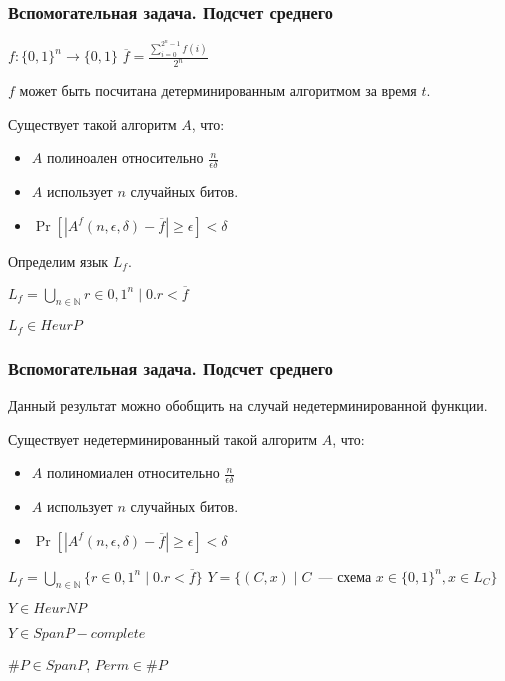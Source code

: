 \begin{frame}
    \frametitle{Вспомогательная задача. Подсчет среднего}

    $f:\{0, 1\}^{n} \rightarrow \{0, 1\}$
    $\overline{f} = \frac{\sum\limits_{i = 0}^{2^n - 1}f(i)}{2^n}$

    $f$ может быть посчитана детерминированным алгоритмом за время $t$.

    \begin{proposition}%
        Существует такой алгоритм $A$, что:
        \begin{itemize}
	        \item $A$ полиноален относительно $\frac{n}{\epsilon\delta}$
        	\item $A$ использует $n$ случайных битов.
        	\item $\Pr[|A^{f}(n, \epsilon, \delta) - \overline{f}| \ge \epsilon] <
		        \delta$
        \end{itemize}
    \end{proposition}

    Определим язык $L_f$.

    $L_f = \bigcup\limits_{n \in \mathbb{N}}{r \in {0, 1}^n \mid 0.r < \overline{f}}$

    \begin{lemma}
        $L_f \in HeurP$
    \end{lemma}
\end{frame}

\begin{frame}
    \frametitle{Вспомогательная задача. Подсчет среднего}

    Данный результат можно обобщить на случай недетерминированной функции.

    \begin{proposition}%
        Существует недетерминированный такой алгоритм $A$, что:
        \begin{itemize}
	        \item $A$ полиномиален относительно $\frac{n}{\epsilon\delta}$
        	\item $A$ использует $n$ случайных битов.
        	\item $\Pr[|A^{f}(n, \epsilon, \delta) - \overline{f}| \ge \epsilon] <
		        \delta$
        \end{itemize}
    \end{proposition}

    $L_f = \bigcup\limits_{n \in \mathbb{N}}\{r \in {0, 1}^n \mid 0.r < \overline{f}\}$
	$Y = \{(C, x) \mid C$~--- схема $x \in \{0, 1\}^n, x \in L_{C}\}$
    
    \begin{lemma}
        $Y \in HeurNP$
    \end{lemma}

    \begin{proposition}
        $Y \in SpanP-complete$
    \end{proposition}
    $\#P \in SpanP$, $Perm \in \#P$
\end{frame}

